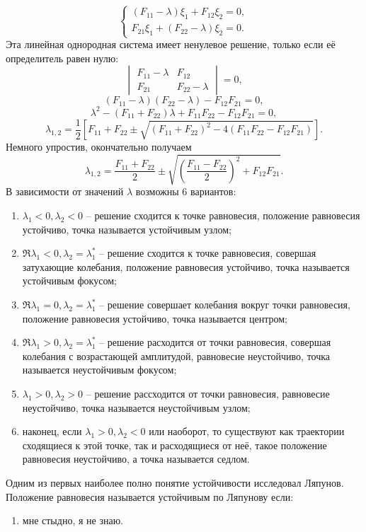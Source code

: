 \[
    \left\{
        \begin{array}{l}
            (F_{11} - \lambda) \xi_1 + F_{12}\xi_2 = 0,\\
            F_{21}\xi_1 + (F_{22} - \lambda) \xi_2 = 0.
        \end{array}
    \right.
\]
Эта линейная однородная система имеет ненулевое решение, только если её
определитель равен нулю:
\[
    \begin{vmatrix}
        F_{11} - \lambda & F_{12}          \\
        F_{21}           & F_{22} - \lambda
    \end{vmatrix}
    = 0,
\]
\[
    (F_{11} - \lambda)(F_{22} - \lambda) - F_{12}F_{21} = 0,
\]
\[
    \lambda^2 - (F_{11} + F_{22}) \lambda + F_{11}F_{22} - F_{12}F_{21} = 0,
\]
\[
    \lambda_{1,2} = \frac{1}{2}\left[ F_{11} + F_{22} \pm
        \sqrt{(F_{11} + F_{22})^2 - 4(F_{11}F_{22} - F_{12}F_{21})} \right].
\]
Немного упростив, окончательно получаем
\[
    \lambda_{1,2} = \frac{F_{11} + F_{22}}{2} \pm
        \sqrt{\left(\frac{F_{11} - F_{22}}{2}\right)^2 + F_{12}F_{21}}.
\]
В зависимости от значений \( \lambda \) возможны 6 вариантов:
\begin{enumerate}
    \item \( \lambda_1 < 0, \lambda_2 < 0 \) -- решение сходится к точке
        равновесия, положение равновесия устойчиво, точка называется устойчивым
        узлом;
    \item \( \Re\lambda_1 < 0, \lambda_2 = \lambda_1^* \) -- решение сходится к
        точке равновесия, совершая затухающие колебания, положение равновесия
        устойчиво, точка называется устойчивым фокусом;
    \item \( \Re\lambda_1 = 0, \lambda_2 = \lambda_1^* \) -- решение совершает
        колебания вокруг точки равновесия, положение равновесия устойчиво, точка
        называется центром;
    \item \( \Re\lambda_1 > 0, \lambda_2 = \lambda_1^* \) -- решение расходится
        от точки равновесия, совершая колебания с возрастающей амплитудой,
        равновесие неустойчиво, точка называется неустойчивым фокусом;
    \item \( \lambda_1 > 0, \lambda_2 > 0 \) -- решение рассходится от точки
        равновесия, равновесие неустойчиво, точка называется неустойчивым узлом;
    \item наконец, если \( \lambda_1 > 0, \lambda_2 < 0 \) или наоборот, то
        существуют как траектории сходящиеся к этой точке, так и расходящиеся от
        неё, такое положение равновесия неустойчиво, а точка называется седлом.
\end{enumerate}

Одним из первых наиболее полно понятие устойчивости исследовал Ляпунов.
Положение равновесия называется устойчивым по Ляпунову если:
\begin{enumerate}
    \item мне стыдно, я не знаю.
\end{enumerate}
